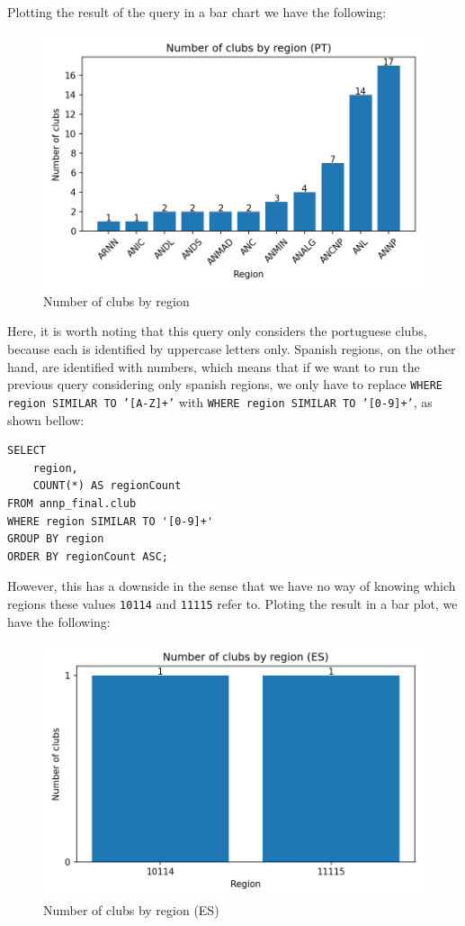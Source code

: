 \documentclass[a4paper, 11pt]{article}
\begin{document}
Plotting the result of the query in a bar chart we have the following:

\vspace{.5\baselineskip}

\begin{figure}[H]
    \centering
    \includegraphics[width=.85\textwidth]{img/clubsbyregion-pt.png}
    \caption{Number of clubs by region}
    \label{fig:clubs-by-region-pt}
\end{figure}

\vspace{.5\baselineskip}

Here, it is worth noting that this query only considers the portuguese clubs, because each is identified by uppercase
letters only.
Spanish regions, on the other hand, are identified with numbers, which means that if we want to run the previous query
considering only spanish regions, we only have to replace \texttt{WHERE region SIMILAR TO '[A-Z]+'} with
\texttt{WHERE region SIMILAR TO '[0-9]+'}, as shown bellow:

\pagebreak

\begin{verbatim}
SELECT
    region,
    COUNT(*) AS regionCount
FROM annp_final.club
WHERE region SIMILAR TO '[0-9]+'
GROUP BY region
ORDER BY regionCount ASC;
\end{verbatim}

However, this has a downside in the sense that we have no way of knowing which regions these values \texttt{10114} and
\texttt{11115} refer to.
Ploting the result in a bar plot, we have the following:

\begin{figure}[H]
    \centering
    \includegraphics[width=.6\textwidth]{img/clubsbyregion-es}
    \caption{Number of clubs by region (ES)}
    \label{fig:clubs-by-region-es}
\end{figure}
\end{document}
